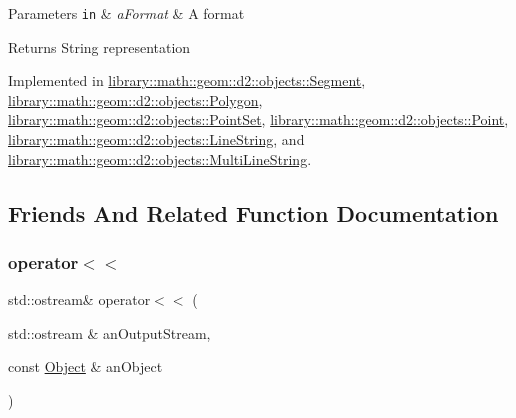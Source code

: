 \begin{DoxyParams}[1]{Parameters}
\mbox{\tt in}  & {\em a\+Format} & A format \\
\hline
\end{DoxyParams}
\begin{DoxyReturn}{Returns}
String representation 
\end{DoxyReturn}


Implemented in \hyperlink{classlibrary_1_1math_1_1geom_1_1d2_1_1objects_1_1_segment_a6efb82e3e5e5d97214b827bc6f8574e3}{library\+::math\+::geom\+::d2\+::objects\+::\+Segment}, \hyperlink{classlibrary_1_1math_1_1geom_1_1d2_1_1objects_1_1_polygon_acef17857f29323e985fba23441ed1171}{library\+::math\+::geom\+::d2\+::objects\+::\+Polygon}, \hyperlink{classlibrary_1_1math_1_1geom_1_1d2_1_1objects_1_1_point_set_a4eeece63192481627cb0f991a4eef1a4}{library\+::math\+::geom\+::d2\+::objects\+::\+Point\+Set}, \hyperlink{classlibrary_1_1math_1_1geom_1_1d2_1_1objects_1_1_point_ae645a37f426dac123d566fb5511d595d}{library\+::math\+::geom\+::d2\+::objects\+::\+Point}, \hyperlink{classlibrary_1_1math_1_1geom_1_1d2_1_1objects_1_1_line_string_a13c0a7c5b8da7724b5a2dd2933064768}{library\+::math\+::geom\+::d2\+::objects\+::\+Line\+String}, and \hyperlink{classlibrary_1_1math_1_1geom_1_1d2_1_1objects_1_1_multi_line_string_a71d1e434196bb8d67054ad28d8aa59a6}{library\+::math\+::geom\+::d2\+::objects\+::\+Multi\+Line\+String}.



\subsection{Friends And Related Function Documentation}
\mbox{\label{classlibrary_1_1math_1_1geom_1_1d2_1_1_object_a418df9bf4a73078f3d494edef1743f8d}} 
\subsubsection{\texorpdfstring{operator$<$$<$}{operator<<}}
{\footnotesize\ttfamily std\+::ostream\& operator$<$$<$ (\begin{DoxyParamCaption}\item[{std\+::ostream \&}]{an\+Output\+Stream,  }\item[{const \hyperlink{classlibrary_1_1math_1_1geom_1_1d2_1_1_object}{Object} \&}]{an\+Object }\end{DoxyParamCaption})\hspace{0.3cm}{\ttfamily [friend]}}



